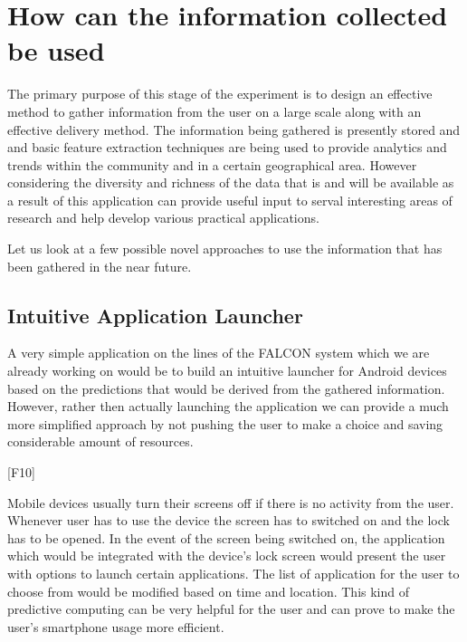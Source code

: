 \documentclass[12pt]{report}
\begin{document}
\begin{itemize}
\end{itemize}



\chapter{How can the information collected be used}

The primary purpose of this stage of the experiment is to design an effective method to gather information from the user on a large scale along with an effective delivery method. The information being gathered is presently stored and and basic feature extraction techniques are being used to provide analytics and trends within the community and in a certain geographical area. However considering the diversity and richness of the data that is and will be available as a result of this application can provide useful input to serval interesting areas of research and help develop various practical applications.

Let us look at a few possible novel approaches to use the information that has been gathered in the near future.

\section{Intuitive Application Launcher}

A very simple application on the lines of the FALCON system \cite{yan2012fast} which we are already working on would be to build an intuitive launcher for Android devices based on the predictions that would be derived from the gathered information. However, rather then actually launching the application we can provide a much more simplified approach by not pushing the user to make a choice and saving considerable amount of resources.

[F10]

Mobile devices usually turn their screens off if there is no activity from the user. Whenever user has to use the device the screen has to switched on and the lock has to be opened. In the event of the screen being switched on, the application which would be integrated with the device's lock screen would present the user with options to launch certain applications. The list of application for the user to choose from would be modified based on time and location. This kind of predictive computing can be very helpful for the user and can prove to make the user's smartphone usage more efficient.
\end{document}
